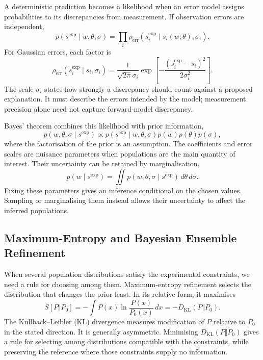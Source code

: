 A deterministic prediction becomes a likelihood when an error model assigns probabilities to its discrepancies from measurement. If observation errors are independent,
\begin{equation}
    p(s^{\text{exp}}\mid w,\theta,\sigma)
    =\prod_i\rho_{\text{err}}\!\left(
    s_i^{\text{exp}}\mid s_i(w;\theta),\sigma_i\right).
    \label{eq:bg-likelihood}
\end{equation}
For Gaussian errors, each factor is
\begin{equation}
    \rho_{\text{err}}(s_i^{\text{exp}}\mid s_i,\sigma_i)
    =\frac{1}{\sqrt{2\pi}\sigma_i}
    \exp\!\left[-\frac{(s_i^{\text{exp}}-s_i)^2}{2\sigma_i^2}\right].
    \label{eq:bg-gaussian-error}
\end{equation}
The scale $\sigma_i$ states how strongly a discrepancy should count against a proposed explanation. It must describe the errors intended by the model; measurement precision alone need not capture forward-model discrepancy.\supercite{bmsb2012ch12}

Bayes' theorem combines this likelihood with prior information,
\begin{equation}
    p(w,\theta,\sigma\mid s^{\text{exp}})
    \propto p(s^{\text{exp}}\mid w,\theta,\sigma)
    p(w)p(\theta)p(\sigma),
    \label{eq:bg-bayesian-posterior}
\end{equation}
where the factorisation of the prior is an assumption. The coefficients and error scales are nuisance parameters when populations are the main quantity of interest. Their uncertainty can be retained by marginalisation,
\begin{equation}
    p(w\mid s^{\text{exp}})=
    \iint p(w,\theta,\sigma\mid s^{\text{exp}})\,d\theta\,d\sigma.
    \label{eq:bg-marginalisation}
\end{equation}
Fixing these parameters gives an inference conditional on the chosen values. Sampling or marginalising them instead allows their uncertainty to affect the inferred populations.\supercite{bmsb2012ch1,bmsb2012ch12}

\subsection{Maximum-Entropy and Bayesian Ensemble Refinement}
\label{sec:bg-maxent}

When several population distributions satisfy the experimental constraints, we need a rule for choosing among them. Maximum-entropy refinement selects the distribution that changes the prior least. In its relative form, it maximises
\begin{equation}
    S[P\Vert P_0]
    =-\int P(x)\ln\frac{P(x)}{P_0(x)}\,dx
    =-D_{\text{KL}}(P\Vert P_0).
    \label{eq:bg-relative-entropy}
\end{equation}
The Kullback--Leibler (KL) divergence measures modification of $P$ relative to $P_0$ in the stated direction. It is generally asymmetric. Minimising $D_{\text{KL}}(P\Vert P_0)$ gives a rule for selecting among distributions compatible with the constraints, while preserving the reference where those constraints supply no information.\supercite{bmsb2012ch1,cesariUsingMaximumEntropy2018}

